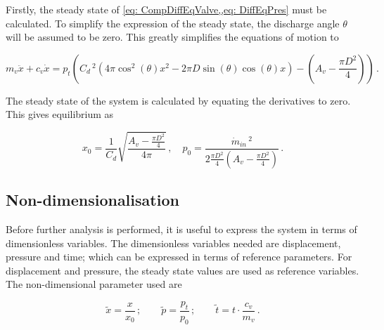 
Firstly, the steady state of \cref{eq: CompDiffEqValve,,eq: DiffEqPres} must be calculated. To simplify the expression of the steady state, the discharge angle $\theta$ will be assumed to be zero. This greatly simplifies the equations of motion to

\begin{equation} \label{eq: ClosingDiffEqFull}
    m_v \ddot{x} + c_v \dot{x} = p_t \left(
    C_d \,^2 \left( 4 \pi \cos^2(\theta) x^2
    - 2 \pi D \sin(\theta) \cos(\theta) x \right)
    - \left( A_v - \frac{\pi D^2}{4} \right)
    \right) \, .
\end{equation}

The steady state of the system is calculated by equating the derivatives to zero. This gives equilibrium as

\begin{equation*}
    x_0 = \frac{1}{C_d} \sqrt{\frac{A_v - \frac{\pi D^2}{4}}{4 \pi}}
    \, , \quad
    p_0 = \frac{\dot{m}_{in} \,^2}{2 \frac{\pi D^2}{4} \left( A_v - \frac{\pi D^2}{4} \right)} \, .
\end{equation*}



\subsection{Non-dimensionalisation}

Before further analysis is performed, it is useful to express the system in terms of dimensionless variables. The dimensionless variables needed are displacement, pressure and time; which can be expressed in terms of reference parameters. For displacement and pressure, the steady state values are used as reference variables. The non-dimensional parameter used are

\begin{equation*}
    \tilde{x} = \frac{x}{x_{0}} \, ; \qquad
    \tilde{p} = \frac{p_t}{p_{0}} \, ; \qquad 
    \tilde{t} = t \cdot \frac{c_v}{m_v} \, .
\end{equation*}

